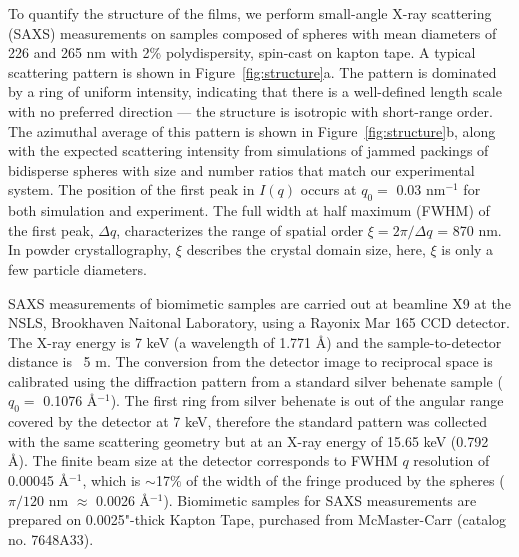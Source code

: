 To quantify the structure of the films, we perform small-angle X-ray scattering (SAXS) measurements on samples composed of spheres with mean diameters of 226 and 265 nm with 2\% polydispersity, spin-cast on kapton tape.
A typical scattering pattern is shown in Figure~\ref{fig:structure}a.
The pattern is dominated by a ring of uniform intensity, indicating that there is a well-defined length scale with no preferred direction --- the structure is isotropic with short-range order.
The azimuthal average of this pattern is shown in Figure~\ref{fig:structure}b, along with the expected scattering intensity from simulations of jammed packings of bidisperse spheres with size and number ratios that match our experimental system.
The position of the first peak in $I(q)$ occurs at $q_0=$ 0.03 nm$^{-1}$ for both simulation and experiment.
The full width at half maximum (FWHM) of the first peak, $\Delta q$, characterizes the range of spatial order $\xi = 2\pi/\Delta q$ = 870 nm.
In powder crystallography, $\xi$ describes the crystal domain size, here, $\xi$ is only a few particle diameters.

SAXS measurements of biomimetic samples are carried out at beamline X9 at the NSLS, Brookhaven Naitonal Laboratory, using a Rayonix Mar 165 CCD detector. 
The X-ray energy is 7 keV (a wavelength of 1.771 \AA) and the sample-to-detector distance is ~5 m. 
The conversion from the detector image to reciprocal space is calibrated using the diffraction pattern from a standard silver behenate sample ($q_0=$ 0.1076 \AA$^{-1}$). 
The first ring from silver behenate is out of the angular range covered by the detector at 7 keV, therefore the standard pattern was collected with the same scattering geometry but at an X-ray energy of 15.65 keV (0.792 \AA). 
The finite beam size at the detector corresponds to FWHM $q$ resolution of 0.00045 \AA$^{-1}$, which is $\sim$17$\%$ of the width of the fringe produced by the spheres ($\pi/120$ nm $\approx$ 0.0026 \AA$^{-1}$).
Biomimetic samples for SAXS measurements are prepared on 0.0025"-thick Kapton Tape, purchased from McMaster-Carr (catalog no. 7648A33).

